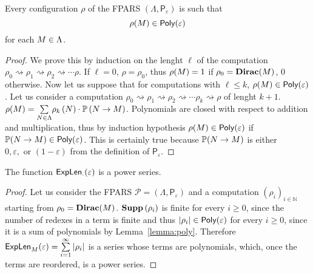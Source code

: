 \begin{lemma}\label{lemma:poly}
	Every configuration $\rho$ of the FPARS $\left(\Lambda,\mathsf{P}_{\varepsilon}\right)$ is such that
	$$
	\rho(M)\in \textsf{Poly}(\varepsilon)
	$$
	for each $M\in\Lambda$.
\end{lemma}
\begin{proof}
	We prove this by induction on the lenght $\ell$ of the computation $\rho_0\rightsquigarrow\rho_1\rightsquigarrow\rho_2\rightsquigarrow\cdots\rho$. If $\ell=0$, $\rho=\rho_0$, thus $\rho(M)=1$ if $\rho_0=\textbf{Dirac}(M)$, $0$ otherwise. Now let us suppose that for computations with $\ell\leq k$, $\rho(M)\in \textsf{Poly}(\varepsilon)$. Let us consider a computation $ \rho_0\rightsquigarrow\rho_1\rightsquigarrow \rho_2\rightsquigarrow\cdots\rho_{k}\rightsquigarrow\rho$ of lenght $k+1$. $\rho(M)=\underset{N\in\Lambda}{\sum}\rho_{k}\left( N\right) \cdot\mathbb{P}\left(N \rightarrow M\right)$. Polynomials are closed with respect to addition and multiplication, thus by induction hypothesis $\rho(M)\in\textsf{Poly}(\varepsilon)$ if $\mathbb{P}(N \rightarrow M)\in\textsf{Poly}(\varepsilon)$. This is certainly true because $\mathbb{P}(N \rightarrow M)$ is either $0,\varepsilon,\textrm{ or }(1-\varepsilon)$ from the definition of $\mathsf{P}_{\varepsilon}$.
\end{proof}
\begin{theorem}
	The function $\textsf{ExpLen}_{\cdot}(\varepsilon)$ is a power series.
\end{theorem}
\begin{proof}
	Let us consider the FPARS $\mathcal{P}=\left(\Lambda,\mathsf{P}_{\varepsilon}\right)$ and a computation $(\rho_i)_{i\in\mathbb{N}}$ starting from $\rho_0=\textbf{Dirac}(M)$. $\textbf{Supp}\left(\rho_i\right)$
	is finite for every $i\geq 0$, since the number of redexes in a term is finite and thus $|\rho_i|\in\textsf{Poly}(\varepsilon)$ for every $i\geq 0$, since it is a sum of polynomials by Lemma~\ref{lemma:poly}. Therefore $\textsf{ExpLen}_{M}(\varepsilon)=\sum\limits_{i=1}^{\infty} |\rho_i|$ is a series whose terms are polynomials, which, once the terms are reordered, is a power series.
\end{proof}
